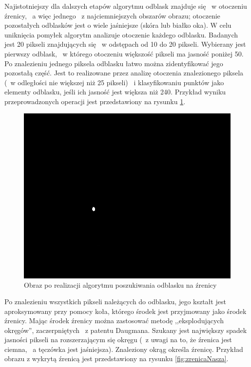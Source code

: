 Najistotniejszy dla dalszych etapów algorytmu odblask znajduje się ~w otoczeniu źrenicy, ~a więc jednego ~z najciemniejszych obszarów obrazu; otoczenie pozostałych odblasków jest o wiele jaśniejsze (skóra lub białko oka). W celu uniknięcia pomyłek algorytm analizuje otoczenie każdego odblasku. Badanych jest 20 pikseli znajdujących się ~w odstępach od 10 do 20 pikseli. Wybierany jest pierwszy odblask, ~w którego otoczeniu większość pikseli ma jasność poniżej 50. Po znalezieniu jednego piksela odblasku łatwo można zidentyfikować jego pozostałą część. Jest to realizowane przez analizę otoczenia znalezionego piksela (~w odległości nie większej niż 25 pikseli) ~i klasyfikowaniu punktów jako elementy odblasku, jeśli ich jasność jest większa niż 240. Przykład wyniku przeprowadzonych operacji jest przedstawiony na rysunku \ref{fig:dobryOdblask}.

\begin{figure}
\begin{center}
\includegraphics[scale=0.5]{odblask.jpg}
\caption{Obraz po realizacji algorytmu poszukiwania odblasku na źrenicy}
\label{fig:dobryOdblask}
\end{center}
\end{figure}

Po znalezieniu wszystkich pikseli należących do odblasku, jego kształt jest aproksymowany przy pomocy koła, którego środek jest przyjmowany jako środek źrenicy. Mając środek źrenicy można zastosować metodę ,,eksplodujących okręgów'', zaczerpniętych ~z patentu Daugmana. Szukany jest największy spadek  jasności pikseli na rozszerzającym się okręgu (~z uwagi na to, że źrenica jest ciemna, ~a tęczówka jest jaśniejsza). Znaleziony okrąg określa źrenicę. Przykład obrazu z wykrytą źrenicą jest przedstawiony na rysunku \ref{fig:zrenicaNasza}.

